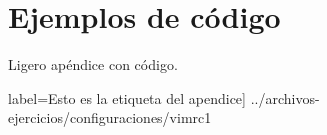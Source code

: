 \chapter{Ejemplos de código}

Ligero apéndice con código.





\lstset{style=colorA, inputencoding=utf8/latin1}
 label=Esto es la etiqueta del apendice] {../archivos-ejercicios/configuraciones/vimrc1}

